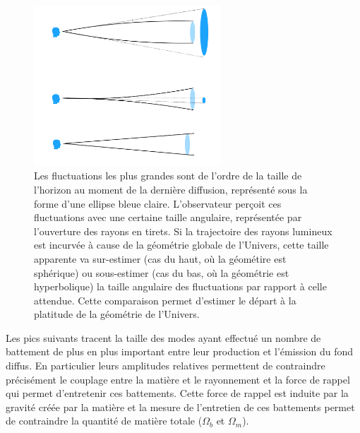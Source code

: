 \begin{figure}[htbp]
	\centering
		\includegraphics[height=6cm]{figs/cmb_geom.png}
		\caption[CMB et géométrie]{Les fluctuations les plus grandes sont de l'ordre de la taille de l'horizon au moment de la dernière diffusion, représenté sous la forme d'une ellipse bleue claire. L'observateur perçoit ces fluctuations avec une certaine taille angulaire, représentée par l'ouverture des rayons en tirets. Si la trajectoire des rayons lumineux est incurvée à cause de la géométrie globale de l'Univers, cette taille apparente va sur-estimer (cas du haut, où la géométire est sphérique) ou sous-estimer (cas du bas, où la géométrie est hyperbolique) la taille angulaire des fluctuations par rapport à celle attendue. Cette comparaison permet d'estimer le départ à la platitude de la géométrie de l'Univers.  }
	\label{f:cmb_geom}
\end{figure}

Les pics suivants tracent la taille des modes ayant effectué un nombre de battement de plus en plus important entre leur production et l'émission du fond diffus. En particulier leurs amplitudes relatives permettent de contraindre précisément le couplage entre la matière et le rayonnement et la force de rappel qui permet d'entretenir ces battements. Cette force de rappel est induite par la gravité créée par la matière et la mesure de l'entretien de ces battements permet de contraindre la quantité de matière totale ($\Omega_b$ et $\Omega_m$). 


